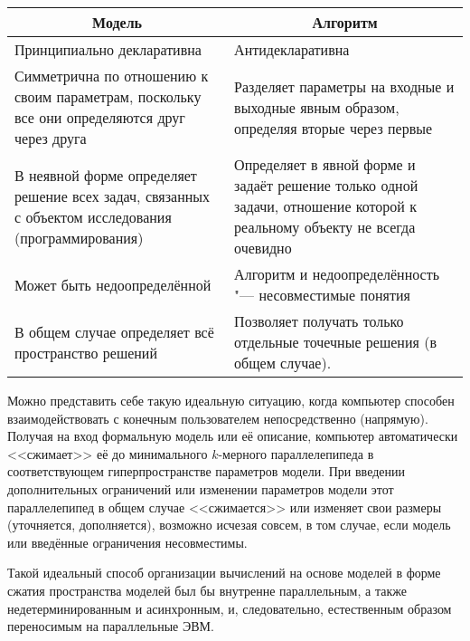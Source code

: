 \begin{table}[ht]
  \centering

  \label{tab:model_and_algorithm}

  \begin{tabular}{m{.45\linewidth}|m{.45\linewidth}} \hline
    \multicolumn{1}{c|}{\large\textbf{Модель}} &
    \multicolumn{1}{c}{\large\textbf{Алгоритм} \rule{0pt}{16pt}} \\[5pt]
    \hline \hline
    
    Принципиально декларативна & Антидекларативна\\ \hline
    
    Симметрична по отношению к своим параметрам, поскольку все они
    определяются друг через друга & Разделяет параметры на входные и
    выходные явным образом, определяя вторые через первые\\ \hline
    
    В неявной форме определяет решение всех задач, связанных с объектом
    исследования (программирования) & Определяет в явной форме и задаёт
    решение только одной задачи, отношение которой к реальному объекту не
    всегда очевидно\\ \hline
    
    Может быть недоопределённой & Алгоритм и недоопределённость "---
    несовместимые понятия\\ \hline
    
    В общем случае определяет всё пространство решений & Позволяет
    получать только отдельные точечные решения (в общем случае).\\ \hline
  \end{tabular}
\end{table}



Можно представить себе такую идеальную ситуацию, когда компьютер
способен взаимодействовать с конечным пользователем непосредственно
(напрямую). Получая на вход формальную модель или её описание,
компьютер автоматически <<сжимает>> её до минимального $k$-мерного
параллелепипеда в соответствующем гиперпространстве параметров
модели. При введении дополнительных ограничений или изменении
параметров модели этот параллелепипед в общем случае <<сжимается>> или
изменяет свои размеры (уточняется, дополняется), возможно исчезая
совсем, в том случае, если модель или введённые ограничения
несовместимы.

Такой идеальный способ организации вычислений на основе моделей в
форме сжатия пространства моделей был бы внутренне параллельным, а
также недетерминированным и асинхронным, и, следовательно,
естественным образом переносимым на параллельные ЭВМ.

